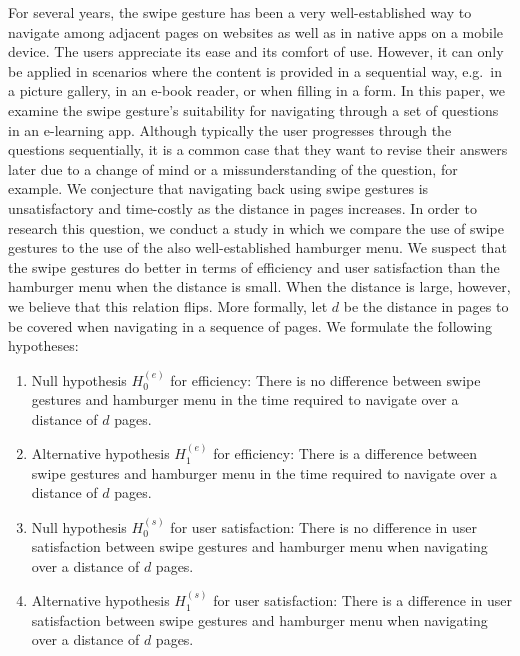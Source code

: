 \documentclass{sig-alternate-05-2015}
\begin{document}
For several years, the swipe gesture has been a very well-established way to navigate among adjacent pages on websites as well as in native
apps on a mobile device. The users appreciate its ease and its comfort of use. However, it can only be applied in scenarios where
the content is provided in a sequential way, e.g.\ in a picture gallery, in an e-book reader, or when filling in a form. In this paper, we
examine the swipe gesture's suitability for navigating through a set of questions in an e-learning app. Although typically the user progresses
through the questions sequentially, it is a common case that they want to revise their answers later due to a change of mind or a missunderstanding
of the question, for example. We conjecture that navigating back using swipe gestures is unsatisfactory and time-costly as the distance in pages
increases. In order to research this question, we conduct a study in which we compare the use of swipe gestures to the use of the also
well-established hamburger menu. We suspect that the swipe gestures do better in terms of efficiency and
user satisfaction than the hamburger menu when the distance is small. When the distance is large, however,
we believe that this relation flips. More formally, let $d$ be the distance in pages to be covered when navigating in a sequence of pages.
We formulate the following hypotheses:
\begin{enumerate}
  \item Null hypothesis $H_0^{(e)}$ for efficiency: There is no difference between swipe gestures and hamburger menu in the time required to navigate over a distance of $d$ pages.
  \item Alternative hypothesis $H_1^{(e)}$ for efficiency: There is a difference between swipe gestures and hamburger menu in the time required to navigate over a distance of $d$ pages.
  \item Null hypothesis $H_0^{(s)}$ for user satisfaction: There is no difference in user satisfaction between swipe gestures and hamburger menu when navigating over a distance of $d$ pages.
  \item Alternative hypothesis $H_1^{(s)}$ for user satisfaction: There is a difference in user satisfaction between swipe gestures and hamburger menu when navigating over a distance of $d$ pages.
\end{enumerate}
\end{document}
